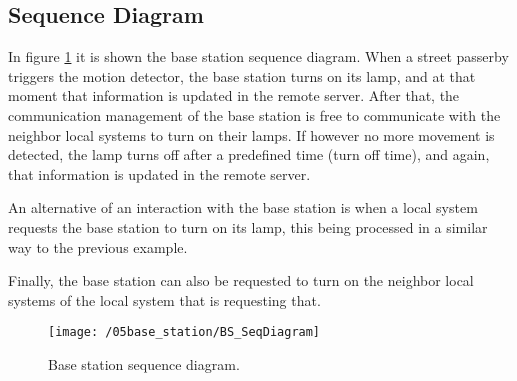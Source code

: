 \subsection{Sequence Diagram}
In figure \ref{fig:bs_seq_diagram} it is shown the base station sequence diagram. When a street passerby triggers the motion detector, the base station turns on its lamp, and at that moment that information is updated in the remote server. After that, the communication management of the base station is free to communicate with the neighbor local systems to turn on their lamps. If however no more movement is detected, the lamp turns off after a predefined time (turn off time), and again, that information is updated in the remote server.

An alternative of an interaction with the base station is when a local system requests the base station to turn on its lamp, this being processed in a similar way to the previous example.

Finally, the base station can also be requested to turn on the neighbor local systems of the local system that is requesting that.
\begin{figure}[ht]
	\centering
	\texttt{[image: /05base\_station/BS\_SeqDiagram]}
	\caption{Base station sequence diagram.}
	\label{fig:bs_seq_diagram}
\end{figure}